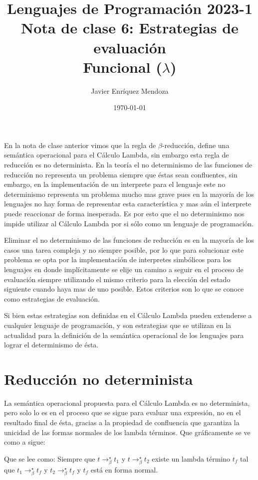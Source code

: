 \documentclass[12pt]{extarticle}
\title{\LARGE 
Lenguajes de Programación 2023-1\\ 
Nota de clase 6: Estrategias de evaluación \\
\color{SeaGreen} Funcional ($\lambda$)}
\author{Javier Enríquez Mendoza }
\date{\today}
\begin{document}
\maketitle 

En la nota de clase anterior vimos que la regla de $\beta$-reducción, define una semántica operacional para el Cálculo Lambda, sin embargo esta regla de reducción es no determinista. En la teoría el no determinismo de las funciones de reducción no representa un problema siempre que éstas sean confluentes, sin embargo, en la implementación de un interprete para el lenguaje este no determinismo representa un problema mucho mas grave pues en la mayoría de los lenguajes no hay forma de representar esta característica y mas aún el interprete puede reaccionar de forma inesperada. Es por esto que el no determinismo nos impide utilizar al Cálculo Lambda por si sólo como un lenguaje de programación. 

Eliminar el no determinismo de las funciones de reducción es en la mayoría de los casos una tarea compleja y no siempre posible, por lo que para solucionar este problema se opta por la implementación de interpretes simbólicos para los lenguajes en donde implícitamente se elije un camino a seguir en el proceso de evaluación siempre utilizando el mismo criterio para la elección del estado siguiente cuando haya mas de uno posible. Estos criterios son lo que se conoce como estrategias de evaluación.

Si bien estas estrategias son definidas en el Cálculo Lambda pueden extenderse a cualquier lenguaje de programación, y son estrategias que se utilizan en la actualidad para la definición de la semántica operacional de los lenguajes para lograr el determinismo de ésta.

\section{Reducción no determinista}

La semántica operacional propuesta para el Cálculo Lambda es no determinista, pero solo lo es en el proceso que se sigue para evaluar una expresión, no en el resultado final de ésta, gracias a la propiedad de confluencia que garantiza la unicidad de las formas normales de los lambda términos. Que gráficamente se ve como a sigue:

\begin{center}
\end{center}
\noindent
Que se lee como: Siempre que $t\to^\star_\beta t_1$ y $t\to^\star_\beta t_2$ existe un lambda término $t_f$ tal que $t_1\to^\star_\beta t_f$ y $t_2\to^\star_\beta t_f$ y $t_f$ está en forma normal.
\end{document}
